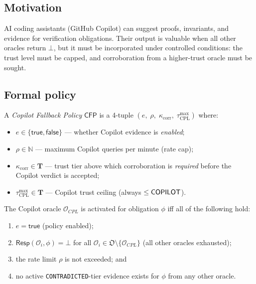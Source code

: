 \documentclass[11pt]{article}
\newcommand{\Oracle}{\mathcal{O}}            %
\newcommand{\OrcSet}{\mathfrak{O}}           %
\newcommand{\Orcl}[1]{\Oracle_{#1}}         %
\newcommand{\CFP}{\mathsf{CFP}}             %
\newcommand{\Resp}{\mathsf{Resp}}           %
\newcommand{\TierSet}{\mathbf{T}}           %
\begin{document}
\subsection{Motivation}

AI coding assistants (\eg GitHub Copilot) can suggest proofs,
invariants, and evidence for verification obligations.  Their output is
valuable when all other oracles return $\bot$, but it must be
incorporated under controlled conditions: the trust level must be capped,
and corroboration from a higher-trust oracle must be sought.

\subsection{Formal policy}

\begin{definition}\label{def:cfp}
  A \emph{Copilot Fallback Policy} $\CFP$ is a 4-tuple
  $(e,\; \rho,\; \kappa_{\mathrm{corr}},\; \tau^{\max}_{\mathrm{CPL}})$
  where:
  \begin{itemize}[nosep]
    \item $e \in \{\mathsf{true}, \mathsf{false}\}$ — whether Copilot
          evidence is \emph{enabled};
    \item $\rho \in \mathbb{N}$ — maximum Copilot queries per minute
          (rate cap);
    \item $\kappa_{\mathrm{corr}} \in \TierSet$ — trust tier above which
          corroboration is \emph{required} before the Copilot verdict
          is accepted;
    \item $\tau^{\max}_{\mathrm{CPL}} \in \TierSet$ — Copilot trust
          ceiling (always $\leq \mathsf{COPILOT}$).
  \end{itemize}
\end{definition}

\begin{definition}\label{def:cpact}
  The Copilot oracle $\Orcl{CPL}$ is activated for obligation $\phi$
  iff all of the following hold:
  \begin{enumerate}[label=(\roman*),nosep]
    \item $e = \mathsf{true}$ (policy enabled);
    \item $\Resp(\Orcl{i}, \phi) = \bot$ for all
          $\Orcl{i} \in \OrcSet \setminus \{\Orcl{CPL}\}$ (all other
          oracles exhausted);
    \item the rate limit $\rho$ is not exceeded; and
    \item no active \texttt{CONTRADICTED}-tier evidence exists for
          $\phi$ from any other oracle.
  \end{enumerate}
\end{definition}
\end{document}
